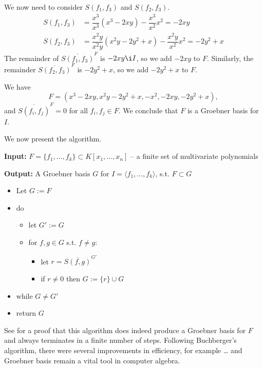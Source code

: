 \documentclass[
]{book}
\theoremstyle{definition}
\theoremstyle{definition}
\theoremstyle{definition}
\theoremstyle{definition}
\theoremstyle{remark}
\begin{document}
We now need to consider \(S(f_1,f_3)\) and \(S(f_2,f_3)\).
\begin{align*}
S\left(f_{1},f_{3}\right)&=\dfrac{x^{3}}{x^{3}}\left(x^{3}-2xy\right)-\dfrac{x^{3}}{x^{2}}x^{2}=-2xy\\S(f_{2},f_{3})&=\dfrac{x^{2}y}{x^{2}y}\left(x^{2}y-2y^{2}+x\right)-\dfrac{x^{2}y}{x^{2}}x^{2}=-2y^{2}+x
\end{align*}
The remainder of \(\overline{S(f_1,f_3)}^F\) is \(-2xy \i I\), so we add \(-2xy\) to \(F\). Similarly, the remainder \(\overline{S(f_2,f_3)}^F\) is \(-2y^{2}+x\), so we add \(-2y^{2}+x\) to \(F\).

We have \[F = \left( x^3 - 2xy, x^2 y - 2y^2 + x, -x^2, -2xy, -2y^2 + x \right),\]
and \(\overline{S(f_i,f_j)}^F=0\) for all \(f_i,f_j \in F\). We conclude that \(F\) is a Groebner basis for \(I\).

We now present the algorithm.

\textbf{Input:} \(F = \{ f_1,\ldots,f_k \} \subset K[x_1,\ldots,x_n]\) -- a finite set of multivariate polynomials

\textbf{Output:} A Groebner basis \(G\) for \(I = \langle f_1,\ldots,f_k \rangle\), s.t. \(F \subset G\)

\begin{itemize}
\item
  Let \(G := F\)
\item
  do

  \begin{itemize}
  \item
    let \(G' := G\)
  \item
    for \(f,g\in G\) s.t. \(f \neq g\):

    \begin{itemize}
    \item
      let \(r = \overline{S(f,g)}^{G'}\)
    \item
      if \(r \ne 0\) then \(G := \{r\} \cup G\)
    \end{itemize}
  \end{itemize}
\item
  while \(G \ne G'\)
\item
  return \(G\)
\end{itemize}

See \citep[ p91, Theorem 2]{cox2013} for a proof that this algorithm does indeed produce a Groebner basis for \(F\) and always terminates in a finite number of steps. Following Buchberger's algorithm, there were several improvements in efficiency, for example \ldots{} and Groebner basis remain a vital tool in computer algebra.
\end{document}
